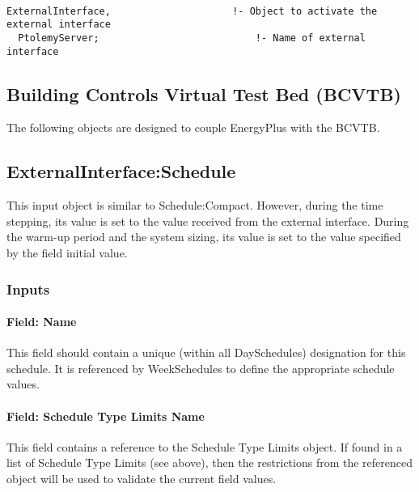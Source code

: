 \begin{lstlisting}

ExternalInterface,                     !- Object to activate the external interface
  PtolemyServer;                           !- Name of external interface
\end{lstlisting}

\subsection{Building Controls Virtual Test Bed (BCVTB)}\label{building-controls-virtual-test-bed-bcvtb}

The following objects are designed to couple EnergyPlus with the BCVTB.

\subsection{ExternalInterface:Schedule}\label{externalinterfaceschedule}

This input object is similar to Schedule:Compact. However, during the time stepping, its value is set to the value received from the external interface. During the warm-up period and the system sizing, its value is set to the value specified by the field initial value.

\subsubsection{Inputs}\label{inputs-1-016}

\paragraph{Field: Name}\label{field-name-1-015}

This field should contain a unique (within all DaySchedules) designation for this schedule. It is referenced by WeekSchedules to define the appropriate schedule values.

\paragraph{Field: Schedule Type Limits Name}\label{field-schedule-type-limits-name}

This field contains a reference to the Schedule Type Limits object. If found in a list of Schedule Type Limits (see above), then the restrictions from the referenced object will be used to validate the current field values.

